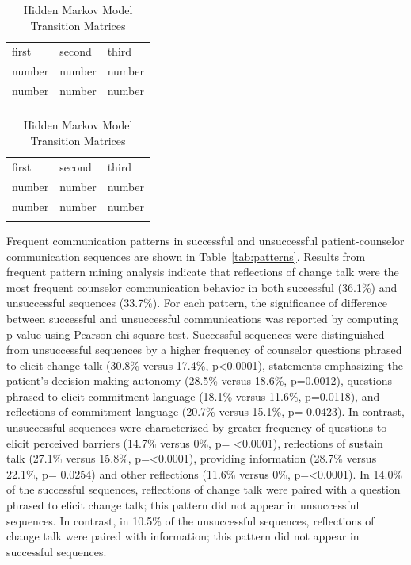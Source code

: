\begin{table}
\caption{Hidden Markov Model Emission Matrices}
\label{tab:emission}       %
\begin{tabular}{lll}
\hline\noalign{\smallskip}
first & second & third  \\
\noalign{\smallskip}\hline\noalign{\smallskip}
number & number & number \\
number & number & number \\
\noalign{\smallskip}\hline
\end{tabular}

\vspace{2\baselineskip}

\caption{Hidden Markov Model Transition Matrices}
\label{tab:transition}       %
\begin{tabular}{lll}
\hline\noalign{\smallskip}
first & second & third  \\
\noalign{\smallskip}\hline\noalign{\smallskip}
number & number & number \\
number & number & number \\
\noalign{\smallskip}\hline
\end{tabular}
\end{table}


Frequent communication patterns in successful and unsuccessful patient-counselor communication sequences are shown in Table~\ref{tab:patterns}. Results from frequent pattern mining analysis indicate that reflections of change talk were the most frequent counselor communication behavior in both successful (36.1\%) and unsuccessful sequences (33.7\%). For each pattern, the significance of difference between successful and unsuccessful communications was reported by computing p-value using Pearson chi-square test. Successful sequences were distinguished from unsuccessful sequences by a higher frequency of counselor questions phrased to elicit change talk (30.8\% versus 17.4\%, p<0.0001), statements emphasizing the patient’s decision-making autonomy (28.5\% versus 18.6\%, p=0.0012), questions phrased to elicit commitment language (18.1\% versus 11.6\%, p=0.0118), and reflections of commitment language (20.7\% versus 15.1\%, p= 0.0423). In contrast, unsuccessful sequences were characterized by greater frequency of questions to elicit perceived barriers (14.7\% versus 0\%, p= <0.0001), reflections of sustain talk (27.1\% versus 15.8\%, p=<0.0001), providing information (28.7\% versus 22.1\%, p= 0.0254) and other reflections (11.6\% versus 0\%, p=<0.0001). In 14.0\% of the successful sequences, reflections of change talk were paired with a question phrased to elicit change talk; this pattern did not appear in unsuccessful sequences. In contrast, in 10.5\% of the unsuccessful sequences, reflections of change talk were paired with information; this pattern did not appear in successful sequences.

